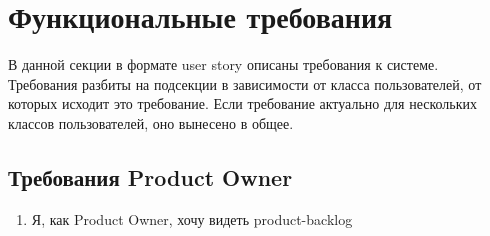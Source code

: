 \documentclass{article}
\begin{document}
\section{Функциональные требования}

В данной секции в формате user story описаны требования к системе.
Требования разбиты на подсекции в зависимости от класса пользователей,
от которых исходит это требование.
Если требование актуально для нескольких классов пользователей, оно
вынесено в общее.

\subsection{Требования Product Owner}
\begin{enumerate}[label=\textbf{POR\arabic*}.]
  \item Я, как Product Owner, хочу видеть \Gls{product-backlog}
\end{enumerate}

\printnoidxglossaries
\end{document}

